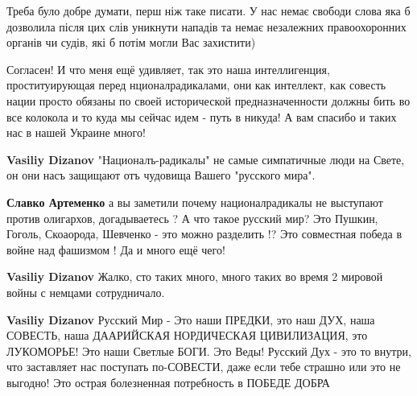 \begin{itemize}


Треба було добре думати, перш ніж таке писати. У нас немає свободи слова яка б
дозволила після цих слів уникнути нападів та немає незалежних правоохоронних
органів чи судів, які б потім могли Вас захистити)




Согласен! И что меня ещё удивляет, так это наша интеллигенция, проституирующая
перед нционалрадикалами, они как интеллект, как совесть нации просто обязаны по
своей исторической предназначенности должны бить во все колокола и то куда мы
сейчас идем - путь в никуда! А вам спасибо и таких нас в нашей Украине много!

\begin{itemize}

\textbf{Vasiliy Dizanov} "Националъ-радикалы" не самые симпатичные люди на Свете, он они насъ защищают отъ чудовища Вашего "русского мира".


\textbf{Славко Артеменко} а вы заметили почему националрадикалы не выступают
против олигархов, догадываетесь ? А что такое русский мир? Это Пушкин, Гоголь,
Скоаорода, Шевченко - это можно разделить !? Это совместная победа в войне над
фашизмом ! Да и много ещё чего!


\textbf{Vasiliy Dizanov} Жалко, сто таких много, много таких во время 2 мировой войны с немцами сотрудничало.


\textbf{Vasiliy Dizanov} Русский Мир - Это наши ПРЕДКИ, это наш ДУХ, наша
СОВЕСТЬ, наша ДААРИЙСКАЯ НОРДИЧЕСКАЯ ЦИВИЛИЗАЦИЯ, это ЛУКОМОРЬЕ! Это наши
Светлые БОГИ. Это Веды! Русский Дух - это то внутри, что заставляет нас
поступать по-СОВЕСТИ, даже если тебе страшно или это не выгодно! Это острая
болезненная потребность в ПОБЕДЕ ДОБРА



\end{itemize}
\end{itemize}
